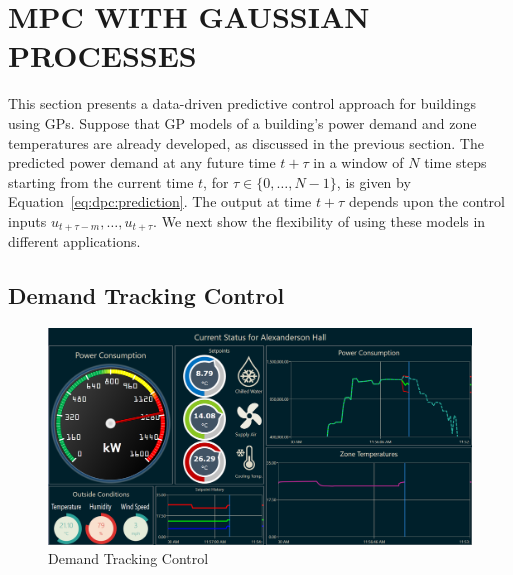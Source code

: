 \section{MPC WITH GAUSSIAN PROCESSES}
\label{S:dpc}

This section presents a data-driven predictive control approach for buildings using GPs.
Suppose that GP models of a building's power demand and zone temperatures are already developed, as discussed in the previous section.
The predicted power demand at any future time $t+\tau$ in a window of $N$ time steps starting from the current time $t$, for \(\tau \in \{0,\dots,N-1\}\), is given by Equation~\eqref{eq:dpc:prediction}.
The output at time \(t+\tau\) depends upon %
the control inputs \(u_{t+\tau-m}, \dots, u_{t+\tau}\).
We next show the flexibility of using these models in different applications.

\subsection{Demand Tracking Control}

\begin{figure}[t]
  \centering
  \includegraphics[width=0.9\linewidth]{images/Dashboard-PowerTrack.png}
  \caption{Demand Tracking Control}
  \label{F:tracking}
\end{figure}

